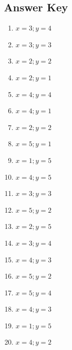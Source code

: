 \documentclass{article}
\begin{document}
\newpage

\subsection*{Answer Key}

\begin{enumerate}
\item $\displaystyle x = 3 ; y = 4 $ \ 
\item $\displaystyle x = 3 ; y = 3 $ \ 
\item $\displaystyle x = 2 ; y = 2 $ \ 
\item $\displaystyle x = 2 ; y = 1 $ \ 
\item $\displaystyle x = 4 ; y = 4 $ \ 
\item $\displaystyle x = 4 ; y = 1 $ \ 
\item $\displaystyle x = 2 ; y = 2 $ \ 
\item $\displaystyle x = 5 ; y = 1 $ \ 
\item $\displaystyle x = 1 ; y = 5 $ \ 
\item $\displaystyle x = 4 ; y = 5 $ \ 
\item $\displaystyle x = 3 ; y = 3 $ \ 
\item $\displaystyle x = 5 ; y = 2 $ \ 
\item $\displaystyle x = 2 ; y = 5 $ \ 
\item $\displaystyle x = 3 ; y = 4 $ \ 
\item $\displaystyle x = 4 ; y = 3 $ \ 
\item $\displaystyle x = 5 ; y = 2 $ \ 
\item $\displaystyle x = 5 ; y = 4 $ \ 
\item $\displaystyle x = 4 ; y = 3 $ \ 
\item $\displaystyle x = 1 ; y = 5 $ \ 
\item $\displaystyle x = 4 ; y = 2 $ \ 

\end{enumerate}
\end{document}
